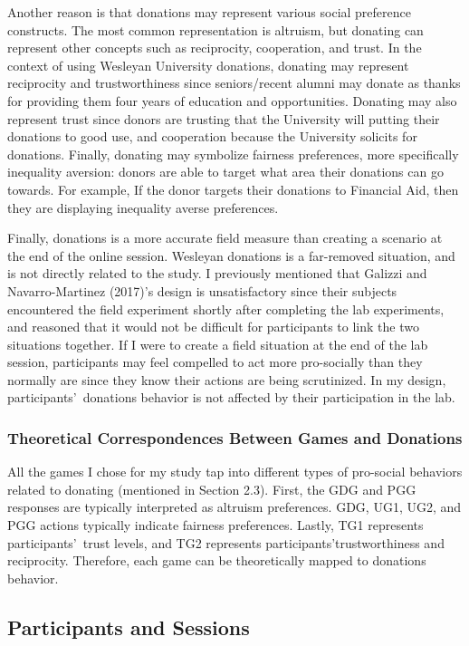 \documentclass[12pt]{article}
\begin{document}
Another reason is that donations may represent various social preference constructs. The most common representation is altruism, but donating can represent other concepts such as reciprocity, cooperation, and trust. In the context of using Wesleyan University donations, donating may represent reciprocity and trustworthiness since seniors/recent alumni may donate as thanks for providing them four years of education and opportunities. Donating may also represent trust since donors are trusting that the University will putting their donations to good use, and cooperation because the University solicits for donations. Finally, donating may symbolize fairness preferences, more specifically inequality aversion: donors are able to target what area their donations can go towards. For example, If the donor targets their donations to Financial Aid, then they are displaying inequality averse preferences.

Finally, donations is a more accurate field measure than creating a scenario at the end of the online session. Wesleyan donations is a far-removed situation, and is not directly related to the study. I previously mentioned that Galizzi and Navarro-Martinez (2017)\rq s design is unsatisfactory since their subjects encountered the field experiment shortly after completing the lab experiments, and reasoned that it would not be difficult for participants to link the two situations together. If I were to create a field situation at the end of the lab session, participants may feel compelled to act more pro-socially than they normally are since they know their actions are being scrutinized. In my design, participants\rq \ donations behavior is not affected by their participation in the lab.

\subsubsection{Theoretical Correspondences Between Games and Donations}

All the games I chose for my study tap into different types of pro-social behaviors related to donating (mentioned in Section 2.3). First, the GDG and PGG responses are typically interpreted as altruism preferences. GDG, UG1, UG2, and PGG actions typically indicate fairness preferences. Lastly, TG1 represents participants\rq \ trust levels, and TG2 represents participants\rq trustworthiness and reciprocity. Therefore, each game can be theoretically mapped to donations behavior.
	
\subsection{Participants and Sessions}
\end{document}

